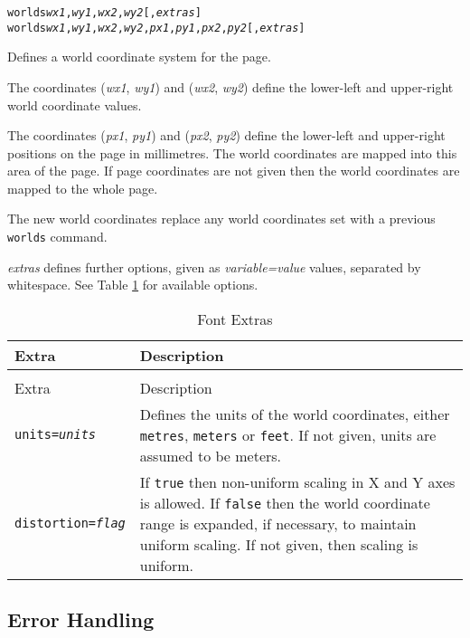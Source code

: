 \begin{alltt}
worlds \textit{wx1}, \textit{wy1}, \textit{wx2}, \textit{wy2} [, \textit{extras} ]
worlds \textit{wx1}, \textit{wy1}, \textit{wx2}, \textit{wy2}, \textit{px1}, \textit{py1}, \textit{px2}, \textit{py2} [, \textit{extras} ]
\end{alltt}

Defines a world coordinate system for the page.

The coordinates
(\textit{wx1}, \textit{wy1}) 
and
(\textit{wx2}, \textit{wy2})
define the lower-left and upper-right world coordinate values.

The coordinates
(\textit{px1}, \textit{py1}) 
and
(\textit{px2}, \textit{py2})
define the lower-left and upper-right positions on the page
in millimetres.  The world coordinates are mapped into this area
of the page.  If page coordinates are not given then the world
coordinates are mapped to the whole page.

The new world coordinates replace any world coordinates
set with a previous \texttt{worlds} command.

\textit{extras} defines further options, given as
\textit{variable=value} values, separated by whitespace.
See Table \ref{worldsextras}
for available options.

\begin{longtable}{|l|p{7cm}|}
\hline
\label{worldsextras}
Extra & Description \\
\hline
\hline
\endfirsthead
\hline
\caption{Font Extras} \\
\endfoot

\hline
Extra & Description \\
\hline
\hline
\endhead

\texttt{units=\textit{units}} &

Defines the units of the world coordinates,
either \texttt{metres}, \texttt{meters} or \texttt{feet}.
If not given, units are assumed to be meters. \\

\texttt{distortion=\textit{flag}} &

If \texttt{true} then non-uniform scaling in X and Y axes
is allowed.  If \texttt{false} then
the world coordinate range is expanded,
if necessary, to maintain uniform scaling.
If not given, then scaling is uniform. \\

\hline
\end{longtable}

\subsection{Error Handling}

